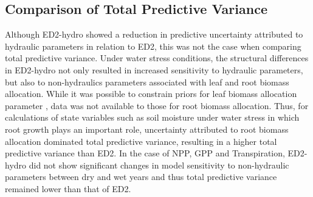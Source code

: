 \subsection*{Comparison of Total Predictive Variance}

Although ED2-hydro showed a reduction in predictive uncertainty attributed  to hydraulic parameters in relation to ED2, this was not the case when comparing total predictive variance. Under water stress conditions, the structural differences in ED2-hydro not only resulted in increased sensitivity to hydraulic parameters, but also to non-hydraulics parameters associated with leaf and root biomass allocation. While it was possible to constrain priors for leaf biomass allocation parameter , data was not available to those for root biomass allocation.  Thus, for calculations of state variables such as soil moisture under water stress in which root growth plays an important role, uncertainty attributed to root biomass allocation dominated total predictive variance, resulting in a higher total predictive variance than ED2. In the case of NPP, GPP and Transpiration, ED2-hydro did not show significant changes in model sensitivity to non-hydraulic parameters between dry and wet years and thus total predictive variance remained lower than that of ED2. 





